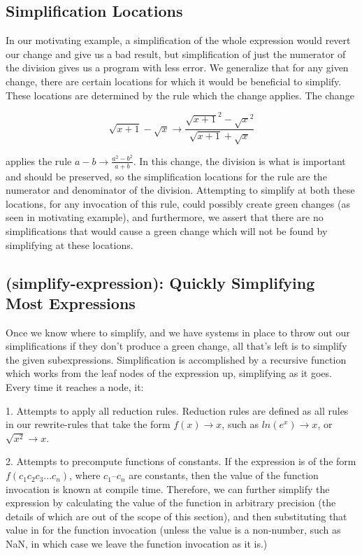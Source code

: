 \documentclass{article}
\newcommand{\lnexp}[1]{ln\left(e^{#1}\right)}
\newcommand{\sqrsqrt}[1]{\sqrt{#1}^2}
\begin{document}
\subsection{Simplification Locations}

In our motivating example, 
a simplification of the whole expression 
would revert our change 
and give us a bad result, 
but simplification of just the numerator 
of the division gives us a program with less error. 
We generalize that for any given change, 
there are certain locations 
for which it would be beneficial to simplify. 
These locations are determined 
by the rule which the change applies. 
The change

\[\sqrt{x + 1} - \sqrt{x} \to \frac{\sqrsqrt{x + 1} - \sqrsqrt{x}}{\sqrt{x + 1} + \sqrt{x}}\]

applies the rule 
$a - b \to  \frac{a^2 - b^2}{a + b}$. 
In this change, 
the division is what is important 
and should be preserved, 
so the simplification locations 
for the rule are the numerator 
and denominator of the division. 
Attempting to simplify at both these locations, 
for any invocation of this rule, 
could possibly create green changes 
(as seen in motivating example), 
and furthermore, 
we assert that there are no simplifications 
that would cause a green change 
which will not be found 
by simplifying at these locations.

\subsection{(simplify-expression): Quickly Simplifying Most Expressions}

Once we know where to simplify, 
and we have systems in place 
to throw out our simplifications 
if they don't produce a green change, 
all that's left is to simplify the given subexpressions. 
Simplification is accomplished 
by a recursive function 
which works from the leaf nodes 
of the expression up, 
simplifying as it goes. 
Every time it reaches a node, it:

1. Attempts to apply all reduction rules. 
Reduction rules are defined as all rules 
in our rewrite-rules 
that take the form $f(x) \to x$, 
such as $\lnexp{x} \to x$, 
or $\sqrt{x^2} \to x$.

2. Attempts to precompute functions of constants. 
If the expression 
is of the form $f(c_1 c_2 c_3... c_n)$, 
where $c_1$--$c_n$ are constants, 
then the value of the function invocation 
is known at compile time. 
Therefore, we can further simplify the expression 
by calculating the value of the function 
in arbitrary precision 
(the details of which are out of the scope of this section), 
and then substituting that value 
in for the function invocation 
(unless the value is a non-number, 
such as NaN, 
in which case we leave the function invocation 
as it is.)
\end{document}
